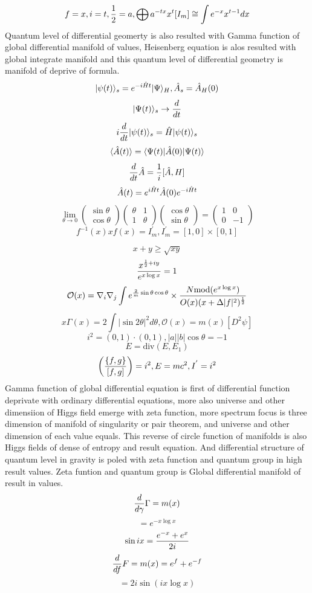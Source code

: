 \documentclass{jsarticle}
\begin{document}
{    $$ f = x, i = t, {1 \over 2} = a, \bigoplus a^{-t x}x^t [I_m]
     \cong \int e^{-x} x^{t - 1}dx $$
     Quantum level of differential geomerty is also resulted with
    Gamma function of global differential manifold of values, Heisenberg
    equation is alos resulted with global integrate manifold and this
    quantum level of differential geometry is manifold of deprive of formula.
    $$ |\psi(t)\rangle_s = e^{-i\Hat{H} t}|\Psi\rangle_{H},
    \Hat{A}_s = \Hat{A}_H(0) $$
    $$ |\Psi(t)\rangle_s \to {d \over dt} $$
    $$ i {d \over dt}|\psi (t) \rangle_s = \Hat{H}|\psi(t)\rangle_s $$
    $$ \langle\Hat{A}(t)\rangle = \langle\Psi(t)|\Hat{A}(0)|\Psi(t)\rangle  $$
    $$ {d \over dt}\Hat{A} = {1 \over i}[\Hat{A},H] $$
    $$ \Hat{A}(t) = e^{i\Hat{H}t}\Hat{A}(0)e^{-i\Hat{H}t} $$
    $$ \lim_{\theta \to 0} \begin{pmatrix} \sin \theta \\
    \cos \theta \end{pmatrix} \begin{pmatrix} \theta & 1 \\
    1 & \theta \end{pmatrix} \begin{pmatrix} \cos \theta \\
    \sin \theta \end{pmatrix} = \begin{pmatrix} 1 & 0 \\
    0 & - 1 \end{pmatrix} $$
    $$ f^{-1}(x) x f(x) = I^{'}_m, I^{'}_m = [1,0] \times [0,1] $$

    $$ {x + y} \ge \sqrt{x y} $$
    $$ {x^{{1 \over 2} + iy} \over e^{x \log x}} = 1 $$
    $$ \mathcal{O}(x) = \nabla_i \nabla_j \int e^{{2 \over m}\sin \theta 
    \cos \theta } \times {{N \mathrm{mod}(e^{x \log x})} \over {O(x)(x +
    \Delta |f|^2)^{1 \over 2}}} $$
    $$ x \Gamma(x) = 2 \int|\sin 2 \theta|^2 d \theta, \mathcal{O}(x)
    = m(x)[D^2 \psi] $$
    $$ i^2 = (0,1) \cdot (0,1), |a||b|\cos \theta = - 1 $$
    $$ E = \mathrm{div}(E, E_1) $$
    $$ \left({\{f,g\}} \over [f,g] \right) = i^2, E = mc^2, I^{'} = i^2 $$
     Gamma function of global differential equation is first of differential
    function deprivate with ordinary differential equations, more also
    universe and other dimensiion of Higgs field emerge with zeta function,
    more spectrum focus is three dimension of manifold of singularity or pair
    theorem, and universe and other dimension of each value equals.
    This reverse of circle function of manifolds is also Higgs fields of 
    dense of entropy and result equation. And differential structure of quantum
    level in gravity is poled with zeta function and quantum group in high 
    result values. Zeta funtion and quantum group is Global differential
    manifold of result in values.
    $$ {d \over d \gamma} \Gamma = m(x) $$
    $$ = e^{- x \log x} $$
    $$ \sin i x = {{e^{-x} + e^{x}} \over 2i} $$
    $$ {d \over df}F = m(x) = e^{f} + e^{-f} $$
    $$ = 2 i \sin (i {x \log x}) $$

}
\end{document}
